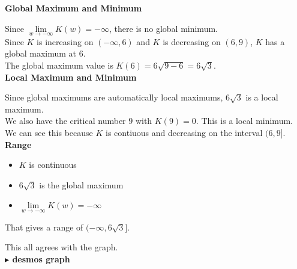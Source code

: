 \documentclass{ximera}
\begin{document}
\begin{example}
\textbf{Global Maximum and Minimum}



Since $\lim\limits_{w \to -\infty} K(w) = -\infty$, there is no global minimum. \\


Since $K$ is increasing on $(-\infty, 6)$ and $K$ is decreasing on $(6, 9)$, $K$ has a global maximum at $6$.  \\

The global maximum value is $K(6) = 6 \sqrt{9 - 6} = 6 \sqrt{3}$. \\




\textbf{Local Maximum and Minimum}


Since global maximums are automatically local maximums, $6 \sqrt{3}$ is a local maximum. \\


We also have the critical number $9$ with $K(9) = 0$.  This is a local minimum.  We can see this because $K$ is contiuous and decreasing on the interval $(6, 9]$. \\









\textbf{Range}

\begin{itemize}
  \item $K$ is continuous
  \item $6 \sqrt{3}$ is the global maximum
  \item $\lim\limits_{w \to -\infty} K(w) = -\infty$
\end{itemize}

That gives a range of $(-\infty, 6 \sqrt{3}]$.




This all agrees with the graph. \\




\textbf{\textcolor{blue!55!black}{$\blacktriangleright$ desmos graph}} 
\begin{center}
\end{center}






\end{example}
\end{document}
